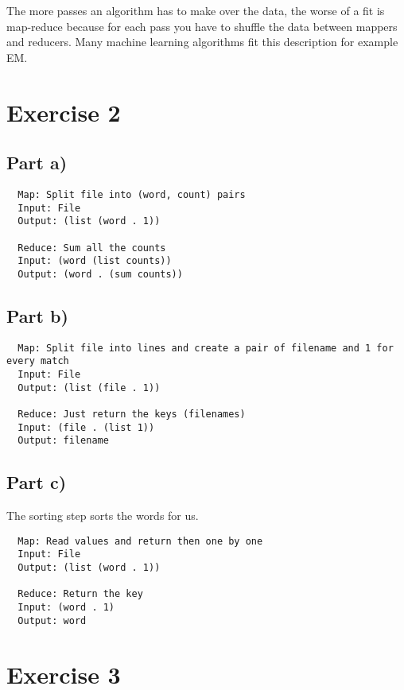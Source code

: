 \documentclass[10pt,a4paper]{article}
\begin{document}
The more passes an algorithm has to make over the data, the worse of a fit is map-reduce because for each pass you have to shuffle the data between mappers and reducers.
Many machine learning algorithms fit this description for example EM.

\section*{Exercise 2}

\subsection*{Part a)}

\begin{verbatim}
  Map: Split file into (word, count) pairs
  Input: File
  Output: (list (word . 1))

  Reduce: Sum all the counts
  Input: (word (list counts))
  Output: (word . (sum counts))
\end{verbatim}

\subsection*{Part b)}

\begin{verbatim}
  Map: Split file into lines and create a pair of filename and 1 for every match
  Input: File
  Output: (list (file . 1))

  Reduce: Just return the keys (filenames)
  Input: (file . (list 1))
  Output: filename
\end{verbatim}

\subsection*{Part c)}

The sorting step sorts the words for us.

\begin{verbatim}
  Map: Read values and return then one by one
  Input: File
  Output: (list (word . 1))

  Reduce: Return the key
  Input: (word . 1)
  Output: word
\end{verbatim}

\section*{Exercise 3}
\end{document}
